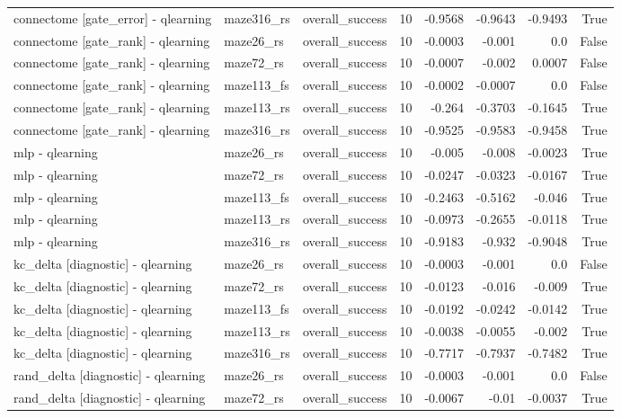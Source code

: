 \begin{table}[t]
\begin{tabular}{lllrrrrr}
connectome [gate\_error] - qlearning & maze316\_rs & overall\_success & 10 & -0.9568 & -0.9643 & -0.9493 & True \\
connectome [gate\_rank] - qlearning & maze26\_rs & overall\_success & 10 & -0.0003 & -0.001 & 0.0 & False \\
connectome [gate\_rank] - qlearning & maze72\_rs & overall\_success & 10 & -0.0007 & -0.002 & 0.0007 & False \\
connectome [gate\_rank] - qlearning & maze113\_fs & overall\_success & 10 & -0.0002 & -0.0007 & 0.0 & False \\
connectome [gate\_rank] - qlearning & maze113\_rs & overall\_success & 10 & -0.264 & -0.3703 & -0.1645 & True \\
connectome [gate\_rank] - qlearning & maze316\_rs & overall\_success & 10 & -0.9525 & -0.9583 & -0.9458 & True \\
mlp - qlearning & maze26\_rs & overall\_success & 10 & -0.005 & -0.008 & -0.0023 & True \\
mlp - qlearning & maze72\_rs & overall\_success & 10 & -0.0247 & -0.0323 & -0.0167 & True \\
mlp - qlearning & maze113\_fs & overall\_success & 10 & -0.2463 & -0.5162 & -0.046 & True \\
mlp - qlearning & maze113\_rs & overall\_success & 10 & -0.0973 & -0.2655 & -0.0118 & True \\
mlp - qlearning & maze316\_rs & overall\_success & 10 & -0.9183 & -0.932 & -0.9048 & True \\
kc\_delta [diagnostic] - qlearning & maze26\_rs & overall\_success & 10 & -0.0003 & -0.001 & 0.0 & False \\
kc\_delta [diagnostic] - qlearning & maze72\_rs & overall\_success & 10 & -0.0123 & -0.016 & -0.009 & True \\
kc\_delta [diagnostic] - qlearning & maze113\_fs & overall\_success & 10 & -0.0192 & -0.0242 & -0.0142 & True \\
kc\_delta [diagnostic] - qlearning & maze113\_rs & overall\_success & 10 & -0.0038 & -0.0055 & -0.002 & True \\
kc\_delta [diagnostic] - qlearning & maze316\_rs & overall\_success & 10 & -0.7717 & -0.7937 & -0.7482 & True \\
rand\_delta [diagnostic] - qlearning & maze26\_rs & overall\_success & 10 & -0.0003 & -0.001 & 0.0 & False \\
rand\_delta [diagnostic] - qlearning & maze72\_rs & overall\_success & 10 & -0.0067 & -0.01 & -0.0037 & True \\

\end{tabular}
\end{table}
